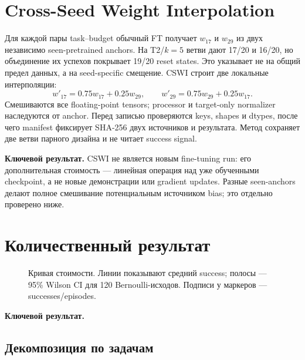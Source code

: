 \documentclass[10pt,twocolumn]{article}
\newcommand{\methodname}{CSWI}
\newcommand{\tightcaption}[1]{\caption{#1}\vspace{-3pt}}
\newcommand{\keyresult}[1]{%
  \par\vspace{2pt}\noindent\colorbox{mist}{\parbox{0.955\linewidth}{\small\sffamily
  \textbf{Ключевой результат.} #1}}\par\vspace{3pt}}
\begin{document}
\section{Cross-Seed Weight Interpolation}

Для каждой пары task--budget обычный FT получает $w_{17}$ и $w_{29}$ из двух независимо
seen-pretrained anchors. На T2/$k=5$ ветви дают 17/20 и 16/20, но объединение их успехов покрывает 19/20 reset
states. Это указывает не на общий предел данных, а на seed-specific смещение. \methodname{} строит
две локальные интерполяции:
\[
w'_{17}=0.75w_{17}+0.25w_{29},\qquad
w'_{29}=0.75w_{29}+0.25w_{17}.
\]
Смешиваются все floating-point tensors; processor и target-only normalizer наследуются от anchor.
Перед записью проверяются keys, shapes и dtypes, после чего manifest фиксирует SHA-256 двух источников
и результата. Метод сохраняет две ветви парного дизайна и не читает success signal.

\keyresult{CSWI не является новым fine-tuning run: его дополнительная стоимость --- линейная
операция над уже обученными checkpoint, а не новые демонстрации или gradient updates. Разные
seen-anchors делают полное смешивание потенциальным источником bias; это отдельно проверено ниже.}

\clearpage
\section{Количественный результат}

\begin{figure}[t]
\centering
\CostCurveFigure
\tightcaption{Кривая стоимости. Линии показывают средний success; полосы --- 95\% Wilson CI для 120
Bernoulli-исходов. Подписи у маркеров --- successes/episodes.}
\label{fig:curve}
\end{figure}

\begin{table}[h]
\centering\scriptsize
\resizebox{\linewidth}{!}{\MainResultTable}
\tightcaption{Success, \% [95\% Wilson CI]. Нулевые результаты показаны явно.}
\label{tab:main}
\end{table}

\begin{table}[h]
\centering\small
\PairedTable
\tightcaption{CSWI против baseline на одинаковых reset states; двусторонний exact McNemar.}
\label{tab:paired}
\end{table}

\keyresult{\CeilingSummary\ \CeilingVerdict}

\subsection{Декомпозиция по задачам}
\end{document}
